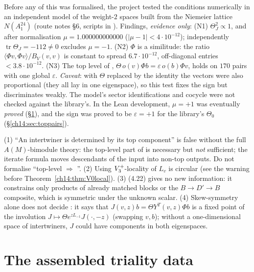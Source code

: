 \begin{warning}[title={Evidence: Numerical de-risking of the normalisation, and its limits}]
Before any of this was formalised, the project tested the conditions numerically in an independent
model of the weight-$2$ spaces built from the Niemeier lattice $N(A_1^{24})$ (route notes
 \S6, scripts in ).  Findings,
\emph{evidence only}:
(N1) $\Theta_J^2\propto1$, and after normalisation $\mu=1.000000000000$ ($|\mu-1|<4\cdot10^{-12}$);
independently $\operatorname{tr}\Theta_J=-112\ne0$ excludes $\mu=-1$.
(N2) $\Phi$ is a similitude: the ratio $\langle\Phi v,\Phi v\rangle/B_V(v,v)$ is constant to spread
$6.7\cdot10^{-12}$, off-diagonal entries $<3.8\cdot10^{-12}$.
(N3) The top level of , $\Theta\,o(v)\Phi b=\varepsilon\,o(b)\Phi v$, holds on $170$ pairs with one
global $\varepsilon$.  \emph{Caveat}: with $\Theta$ replaced by the identity the vectors were also
proportional (they all lay in one eigenspace), so this test fixes the sign but discriminates weakly.
The model's sector identifications and cocycle were not checked against the library's.
In the Lean development, $\mu=+1$ was eventually \emph{proved} (\S\ref{ch14:sec:assemble}), and the
sign was proved to be $\varepsilon=+1$ for the library's $\Theta_0$ (\S\ref{ch14:sec:toppairs}).
\end{warning}

\begin{warning}[title={Trap / dead end: Dead ends recorded at this stage}]
(1) ``An intertwiner is determined by its top component'' is false without the full $A(M)$-bimodule
theory: the top-level part of  is necessary but \emph{not} sufficient; the iterate
formula moves descendants of the input into non-top outputs.  Do not formalise ``top-level
 $\Rightarrow$ ''.
(2) Using $V_3^{+}$-locality of $L_v$ is circular (see the warning before
Theorem~\ref{ch14:thm:V0local}).
(3) (4.22) gives no new information: it constrains only products of already matched blocks or the
$B\to D'\to B$ composite, which is symmetric under the unknown scalar.
(4) Skew-symmetry alone does not decide : it says that
$J(v,z)b=\Theta Y^T(v,z)\Phi b$ is a fixed point of the involution $J\mapsto\Theta e^{zL_{-1}}J(\cdot,-z)$
(swapping $v,b$); without a one-dimensional space of intertwiners, $J$ could have components in both
eigenspaces.
\end{warning}

\section{The assembled triality data}\label{ch14:sec:assemble}

